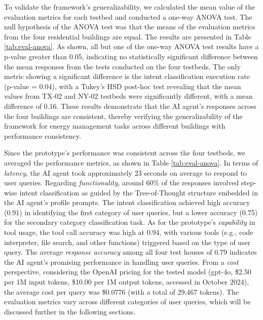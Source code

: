 \documentclass[final,3p,times]{elsarticle}
\begin{document}
To validate the framework’s generalizability, we calculated the mean value of the evaluation metrics for each testbed and conducted a one-way ANOVA test. The null hypothesis of the ANOVA test was that the means of the evaluation metrics from the four residential buildings are equal. The results are presented in Table \ref{tab:eval-anova}. As shown, all but one of the one-way ANOVA test results have a p-value greater than 0.05, indicating no statistically significant difference between the mean responses from the tests conducted on the four testbeds. The only metric showing a significant difference is the intent classification execution rate (p-value = 0.04), with a Tukey’s HSD post-hoc test revealing that the mean values from TX-02 and NY-02 testbeds were significantly different, with a mean difference of 0.16. These results demonstrate that the AI agent's responses across the four buildings are consistent, thereby verifying the generalizability of the framework for energy management tasks across different buildings with performance consistency.

Since the prototype's performance was consistent across the four testbeds, we averaged the performance metrics, as shown in Table \ref{tab:eval-anova}. In terms of \textit{latency}, the AI agent took approximately 23 seconds on average to respond to user queries. Regarding \textit{functionality}, around 60\% of the responses involved step-wise intent classification as guided by the Tree-of-Thought structure embedded in the AI agent's profile prompts. The intent classification achieved high accuracy (0.91) in identifying the first category of user queries, but a lower accuracy (0.75) for the secondary category classification task. As for the prototype's \textit{capability} in tool usage, the tool call accuracy was high at 0.94, with various tools (e.g., code interpreter, file search, and other functions) triggered based on the type of user query. The average \textit{response accuracy} among all four test houses of 0.79 indicates the AI agent's promising performance in handling user queries. From a \textit{cost} perspective, considering the OpenAI pricing for the tested model (gpt-4o, \$2.50 per 1M input tokens, \$10.00 per 1M output tokens, accessed in October 2024), the average cost per query was \$0.0776 (with a total of 29,467 tokens). The evaluation metrics vary across different categories of user queries, which will be discussed further in the following sections.
\end{document}
